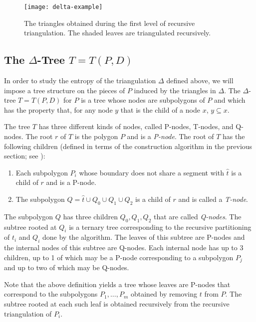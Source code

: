 \documentclass[lotsofwhite]{patmorin}
\newcommand{\z}[1]{{\hat{#1}}}
\begin{document}
\begin{figure}
  \begin{center}
      \texttt{[image: delta-example]}
  \end{center}
  \caption{The triangles obtained during the first level of recursive
triangulation.  The shaded leaves are triangulated recursively.}
\end{figure}

\subsection{The $\Delta$-Tree $T=T(P,D)$}

In order to study the entropy of the triangulation $\Delta$ defined
above, we will impose a tree structure on the pieces of $P$ induced by
the triangles in $\Delta$.  The $\Delta$-tree $T=T(P,D)$ for $P$ is a
tree whose nodes are subpolygons of $P$ and which has the property
that, for any node $y$ that is the child of a node $x$, $y\subseteq
x$.

The tree $T$ has three different kinds of nodes, called P-nodes,
T-nodes, and Q-nodes.  The root $r$ of $T$ is the polygon $P$ and is
a \emph{P-node}.  The root of $T$ has the following children
(defined in terms of the construction algorithm in the previous
section; see ):

\begin{enumerate}
\item Each subpolygon $P_i$ whose boundary does not share a segment
      with $\z t$ is a child of $r$ and is a P-node.  
\item The subpolygon $Q=\z t\cup Q_0\cup Q_1\cup Q_2$ is a child of $r$ and is
called a \emph{T-node}.
\end{enumerate}

The subpolygon $Q$ has three children $Q_0,Q_1,Q_2$ that are called
\emph{Q-nodes}.  The subtree rooted at $Q_i$ is a ternary tree
corresponding to the recursive partitioning of $t_i$ and $Q_i$ done by
the algorithm. The leaves of this subtree are P-nodes and the internal
nodes of this subtree are Q-nodes.  Each internal node has up to 3
children, up to 1 of which may be a P-node corresponding to a
subpolygon $P_j$ and up to two of which may be Q-nodes.

Note that the above definition yields a tree whose leaves are P-nodes
that correspond to the subpolygons $P_1,\ldots,P_m$  obtained by
removing $t$ from $P$.  The subtree rooted at each such leaf is
obtained recursively from the recursive triangulation of $P_i$.
\end{document}
